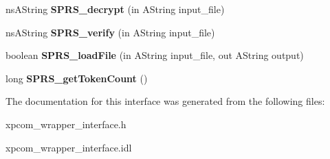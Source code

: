 \begin{DoxyCompactItemize}
\item 
\hypertarget{classnsISPRS__PKCS11__Wrapper_a29ba55c7ae20fe78275247a5122817cc}{
nsAString {\bfseries SPRS\_\-decrypt} (in AString input\_\-file)}
\label{classnsISPRS__PKCS11__Wrapper_a29ba55c7ae20fe78275247a5122817cc}

\item 
\hypertarget{classnsISPRS__PKCS11__Wrapper_a689e52a981017658e697a91de211cac4}{
nsAString {\bfseries SPRS\_\-verify} (in AString input\_\-file)}
\label{classnsISPRS__PKCS11__Wrapper_a689e52a981017658e697a91de211cac4}

\item 
\hypertarget{classnsISPRS__PKCS11__Wrapper_ad4590f99278e01515bafe280b1d80faf}{
boolean {\bfseries SPRS\_\-loadFile} (in AString input\_\-file, out AString output)}
\label{classnsISPRS__PKCS11__Wrapper_ad4590f99278e01515bafe280b1d80faf}

\item 
\hypertarget{classnsISPRS__PKCS11__Wrapper_aeb44d733b48bfd31ca69b803bb120387}{
long {\bfseries SPRS\_\-getTokenCount} ()}
\label{classnsISPRS__PKCS11__Wrapper_aeb44d733b48bfd31ca69b803bb120387}

\end{DoxyCompactItemize}


The documentation for this interface was generated from the following files:\begin{DoxyCompactItemize}
\item 
xpcom\_\-wrapper\_\-interface.h\item 
xpcom\_\-wrapper\_\-interface.idl\end{DoxyCompactItemize}
